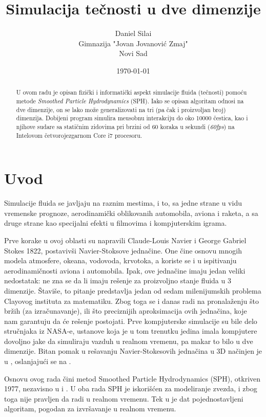 \documentclass[12pt]{article}
\title{Simulacija te\v cnosti u dve dimenzije}
\author{
        Daniel Sila\dj i \\
        Gimnazija "Jovan Jovanovi\'{c} Zmaj"\\
		Novi Sad
}
\date{\today}
\begin{document}
\maketitle

\begin{abstract}
U ovom radu je opisan fizi\v cki i informati\v cki aspekt simulacije fluida (te\v cnosti) pomo\'cu metode \emph{Smoothed Particle Hydrodynamics} (SPH). Iako se opisan algoritam odnosi na dve dimenzije, on se lako mo\v ze generalizovati na tri (pa \v cak i proizvoljan broj) dimenzija. Dobijeni program simulira me\dj usobnu interakciju do oko 10000 \v cestica, kao i njihove sudare sa stati\v cnim zidovima pri brzini od 60 koraka u sekundi (\emph{60fps}) na Intelovom \v cetvorojezgarnom Core i7 procesoru.
\end{abstract}

\section{Uvod}\label{uvod} Simulacije fluida se javljaju na raznim mestima, i to, sa jedne strane u vidu vremenske prognoze, aerodinami\v cki oblikovanih automobila, aviona i raketa, a sa druge strane kao specijalni efekti u filmovima i kompjuterskim igrama.

\label{istorija}
    Prve korake u ovoj oblasti su napravili Claude-Louis Navier i George Gabriel Stokes 1822, postaviv\v si Navier-Stoksove jedna\v cine.
    One \v cine osnovu mnogih modela atmosfere, okeana, vodovoda, krvotoka, a koriste se i u ispitivanju aerodinami\v cnosti aviona i automobila. Ipak, ove jedna\v cine imaju jedan veliki nedostatak: ne zna se da li imaju re\v senje za proizvoljno stanje fluida u 3 dimenzije. \v Stavi\v se, to pitanje predstavlja jedan od sedam milenijumskih problema Clayovog instituta za matematiku. Zbog toga se i danas radi na pronala\v zenju \v sto br\v zih (za izra\v cunavanje), ili \v sto preciznijih aproksimacija ovih jedna\v cina, koje nam garantuju da \'ce re\v senje postojati.
    Prve kompjuterske simulacije su bile delo stru\v cnjaka iz NASA-e, ustanove koja je u tom trenutku jedina imala kompjutere dovoljno jake da simuliraju vazduh u realnom vremenu, pa makar to bilo u dve dimenzije. Bitan pomak u re\v savanju Navier-Stokesovih jedna\v cina u 3D na\v cinjen je u \cite{Foster:1996:RAL:244304.244315}, oslanjaju\'ci se na \cite{harlow:2182}.

    Osnovu ovog rada \v cini metod Smoothed Particle Hydrodynamics (SPH), otkriven 1977, nezavisno u \cite{1977MNRAS.181..375G} i \cite{1977AJ.....82.1013L}. U oba rada SPH je iskori\v s\'cen za modeliranje zvezda, i zbog toga nije pravljen da radi u realnom vremenu. Tek u \cite{Muller:2003:PFS:846276.846298} je dat pojednostavljeni algoritam, pogodan za izvr\v savanje u realnom vremenu.
\end{document}
